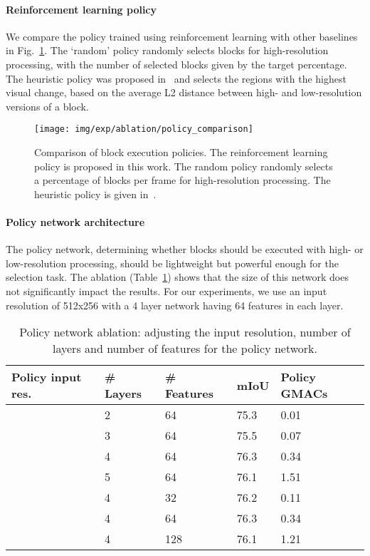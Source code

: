 \paragraph*{\textbf{Reinforcement learning policy}}
We compare the policy trained using reinforcement learning with other baselines in Fig.~\ref{fig:policy_ablation}. The `random' policy randomly selects blocks for high-resolution processing, with the number of selected blocks given by the target percentage. The heuristic policy was proposed in~\cite{verelst2020segblocks} and selects the regions with the highest visual change, based on the average L2 distance between high- and low-resolution versions of a block. 

\begin{figure}[tb]
\centering
\texttt{[image: img/exp/ablation/policy\_comparison]}
\caption{
{Comparison of block execution policies. The reinforcement learning policy is proposed in this work. The random policy randomly selects a percentage of blocks per frame for high-resolution processing. The heuristic policy is given in~\cite{verelst2020segblocks}. }
}
\label{fig:policy_ablation}
\end{figure}

\paragraph*{\textbf{Policy network architecture}}
The policy network, determining whether blocks should be executed with high- or low-resolution processing, should be lightweight but powerful enough for the selection task. The ablation (Table~\ref{tab:ablation_policynet}) shows that the size of this network does not significantly impact the results. For our experiments, we use an input resolution of 512x256 with a 4 layer network having 64 features in each layer.


\begin{table}[tb]
\scriptsize
\centering
\caption{Policy network ablation: adjusting the input resolution, number of layers and number of features for the policy network.}
\label{tab:ablation_policynet}
\begin{tabular}{@{}lllll@{}}
\toprule
\textbf{Policy input res.} & \textbf{\# Layers} & \textbf{\# Features} & \textbf{mIoU} & \textbf{Policy GMACs} \\ \midrule
 & 2 & 64  & 75.3 & 0.01 \\
 & 3 & 64  & 75.5 & 0.07 \\
 & 4 & 64  & 76.3 & 0.34 \\
 & 5 & 64  & 76.1 & 1.51 \\
\midrule

 & 4 & 32  & 76.2 & 0.11 \\
 & 4 & 64  & 76.3 & 0.34 \\
 & 4 & 128 & 76.1 & 1.21 \\ \bottomrule
\end{tabular}
\end{table}




